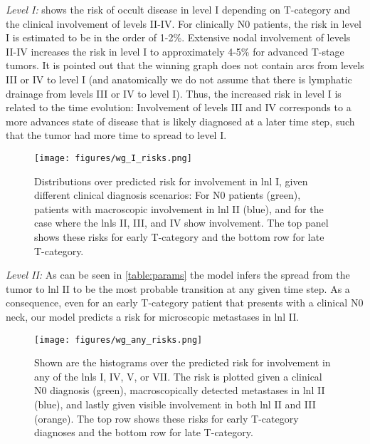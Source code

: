 \documentclass[twocolumn]{aastex631}
\begin{document}
{\it Level I:}  shows the risk of occult disease in level I depending on T-category and the clinical involvement of levels II-IV. For clinically N0 patients, the risk in level I is estimated to be in the order of 1-2\%. Extensive nodal involvement of levels II-IV increases the risk in level I to approximately 4-5\% for advanced T-stage tumors. It is pointed out that the winning graph does not contain arcs from levels III or IV to level I (and anatomically we do not assume that there is lymphatic drainage from levels III or IV to level I). Thus, the increased risk in level I is related to the time evolution: Involvement of levels III and IV corresponds to a more advances state of disease that is likely diagnosed at a later time step, such that the tumor had more time to spread to level I.

\begin{figure}
    \begin{centering}
        \texttt{[image: figures/wg\_I\_risks.png]}
        \caption{Distributions over predicted risk for involvement in \gls{lnl} I, given different clinical diagnosis scenarios: For N0 patients (green), patients with macroscopic involvement in \gls{lnl} II (blue), and for the case where the \glspl{lnl} II, III, and IV show involvement. The top panel shows these risks for early T-category and the bottom row for late T-category.}
        \label{fig:wg_I_risks}
    \end{centering}
\end{figure}

{\it Level II:} As can be seen in \cref{table:params} the model infers the spread from the tumor to \gls{lnl} II to be the most probable transition at any given time step. As a consequence, even for an early T-category patient that presents with a clinical N0 neck, our model predicts a  risk for microscopic metastases in \gls{lnl} II.

\begin{figure}
    \begin{centering}
        \texttt{[image: figures/wg\_any\_risks.png]}
        \caption{Shown are the histograms over the predicted risk for involvement in any of the \glspl{lnl} I, IV, V, or VII. The risk is plotted given a clinical N0 diagnosis (green), macroscopically detected metastases in \gls{lnl} II (blue), and lastly given visible involvement in both \gls{lnl} II and III (orange). The top row shows these risks for early T-category diagnoses and the bottom row for late T-category.}
        \label{fig:wg_any_risks}
    \end{centering}
\end{figure}
\end{document}
